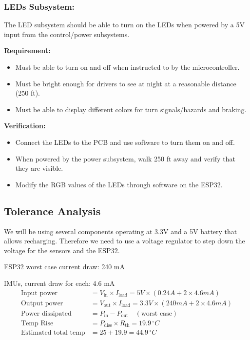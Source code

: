 \documentclass[12pt]{article}
\begin{document}
\subsubsection{LEDs Subsystem:} 
The LED subsystem should be able to turn on the LEDs when powered by a 5V input from the control/power subsystems.

\textbf{Requirement:} 
\begin{itemize}
    \item Must be able to turn on and off when instructed to by the microcontroller.
    \item Must be bright enough for drivers to see at night at a reasonable distance (250 ft).
    \item Must be able to display different colors for turn signals/hazards and braking.
\end{itemize}

\textbf{Verification:}
\begin{itemize}
    \item Connect the LEDs to the PCB and use software to turn them on and off.
    \item When powered by the power subsystem, walk 250 ft away and verify that they are visible.
    \item Modify the RGB values of the LEDs through software on the ESP32.
\end{itemize}

\subsection{Tolerance Analysis}
We will be using several components operating at 3.3V and a 5V 
battery that allows recharging. Therefore we need to use a 
voltage regulator to step down the voltage for the sensors 
and the ESP32. 

\noindent ESP32 worst case current draw: 240 mA

 IMUs, current draw for each: 4.6 mA
\begin{align*}
    \text{Input power} &= V_{\text{in}} \times I_{\text{load}} = 5V \times (0.24A + 2 \times 4.6mA) \\
    \text{Output power} &= V_{\text{out}} \times I_{\text{load}} = 3.3V \times (240mA + 2 \times 4.6mA) \\
    \text{Power dissipated} &= P_{\text{in}} - P_{\text{out}} \quad (\text{worst case}) \\
    \text{Temp Rise} &= P_{\text{diss}} \times R_{\text{th}} = 19.9 \, ^{\circ}C \\
    \text{Estimated total temp} &= 25 + 19.9 = 44.9 \, ^{\circ}C
\end{align*}
\end{document}
